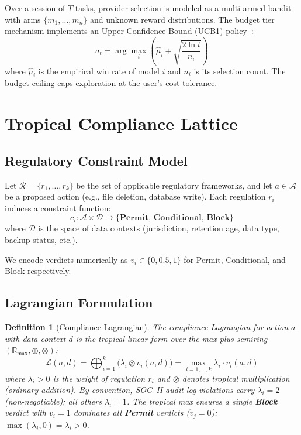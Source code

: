 \documentclass[11pt,twocolumn]{article}
\newtheorem{definition}{Definition}
\newcommand{\tplus}{\oplus}
\newcommand{\ttimes}{\otimes}
\newcommand{\R}{\mathbb{R}}
\newcommand{\Rmax}{\R_{\max}}
\begin{document}
Over a session of $T$ tasks, provider selection is modeled as a multi-armed bandit
with arms $\{m_1, \ldots, m_n\}$ and unknown reward distributions. The budget tier
mechanism implements an Upper Confidence Bound (UCB1) policy~\cite{auer2002finite}:
\begin{equation}
  a_t = \arg\max_i \left(\hat{\mu}_i + \sqrt{\frac{2 \ln t}{n_i}}\right)
  \label{eq:ucb}
\end{equation}
where $\hat{\mu}_i$ is the empirical win rate of model $i$ and $n_i$ is its selection
count. The budget ceiling caps exploration at the user's cost tolerance.

\section{Tropical Compliance Lattice}
\label{sec:compliance}

\subsection{Regulatory Constraint Model}

Let $\mathcal{R} = \{r_1, \ldots, r_k\}$ be the set of applicable regulatory
frameworks, and let $a \in \mathcal{A}$ be a proposed action (e.g., file deletion,
database write). Each regulation $r_i$ induces a constraint function:
\begin{equation}
  c_i : \mathcal{A} \times \mathcal{D} \to \{\mathbf{Permit},\, \mathbf{Conditional},\, \mathbf{Block}\}
\end{equation}
where $\mathcal{D}$ is the space of data contexts (jurisdiction, retention age,
data type, backup status, etc.).

We encode verdicts numerically as $v_i \in \{0, 0.5, 1\}$ for Permit, Conditional,
and Block respectively.

\subsection{Lagrangian Formulation}

\begin{definition}[Compliance Lagrangian]
The compliance Lagrangian for action $a$ with data context $d$ is the tropical
linear form over the max-plus semiring $(\Rmax, \tplus, \ttimes)$:
\begin{equation}
  \mathcal{L}(a, d) = \bigoplus_{i=1}^{k} \bigl(\lambda_i \otimes v_i(a, d)\bigr)
                    = \max_{i=1,\ldots,k} \lambda_i \cdot v_i(a, d)
  \label{eq:lagrangian}
\end{equation}
where $\lambda_i > 0$ is the weight of regulation $r_i$ and $\otimes$ denotes
tropical multiplication (ordinary addition). By convention, SOC~II audit-log
violations carry $\lambda_i = 2$ (non-negotiable); all others $\lambda_i = 1$.
The tropical max ensures a single \textbf{Block} verdict with $v_i = 1$
dominates all \textbf{Permit} verdicts ($v_j = 0$): $\max(\lambda_i, 0) = \lambda_i > 0$.
\end{definition}
\end{document}
